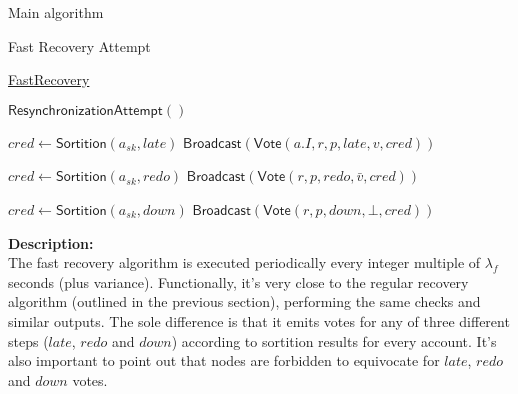 \documentclass[10pt,a4paper]{article}
\begin{document}
\begin{section}{Main algorithm}
\begin{subsection}{Fast Recovery Attempt}
    \begin{algorithm}[H]
        \caption{\underline{FastRecovery}}
        \label{algo:fast-recovery}
        \begin{algorithmic}[1]


        \State $\mathsf{ResynchronizationAttempt}()$
    
                \State $cred \gets 
                \mathsf{Sortition}(a_{sk}, late)$
                    \State $\mathsf{Broadcast}(\mathsf{Vote}(a.I, r, p, late, v, cred))$
                \EndIf

                    \State $cred \gets 
                    \mathsf{Sortition}(a_{sk}, redo)$
                        \State $\mathsf{Broadcast}(\mathsf{Vote}(r,p,redo,\bar{v}, cred))$
                    \EndIf

            \Else
                \State $cred \gets 
                \mathsf{Sortition}(a_{sk}, down)$
                    \State $\mathsf{Broadcast}(\mathsf{Vote}(r,p,down,\bot, cred))$
                \EndIf
            \EndIf
        \EndFor

        \EndFunction
        \end{algorithmic}
    \end{algorithm}
    
    
    \noindent \textbf{Description:}\\
    The fast recovery algorithm is executed periodically every integer multiple of $\lambda_f$
    seconds (plus variance).
    Functionally, it's very close to the regular recovery algorithm (outlined in the previous section), 
    performing the same checks and similar outputs. The sole difference is that it emits votes 
    for any of three different steps ($late$, $redo$ and $down$) according to sortition 
    results for every account.
    It's also important to point out that nodes are forbidden to equivocate for $late$, $redo$ and $down$ votes.
\end{subsection}


\end{section}
\end{document}
